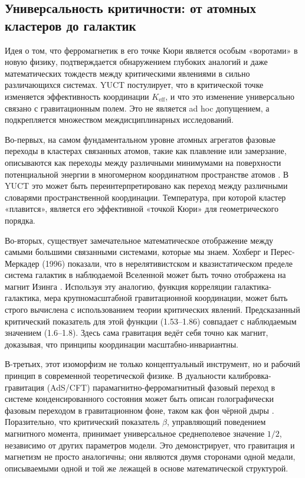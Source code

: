 \documentclass[12pt]{article}
\theoremstyle{remark}
\begin{document}
	\subsection{Универсальность критичности: от атомных кластеров до галактик}
	\label{subsec:universality}
	
	Идея о том, что ферромагнетик в его точке Кюри является особым «воротами» в новую физику, подтверждается обнаружением глубоких аналогий и даже математических тождеств между критическими явлениями в сильно различающихся системах. YUCT постулирует, что в критической точке изменяется эффективность координации $K_{\mathrm{eff}}$, и что это изменение универсально связано с гравитационным полем. Это не является ad hoc допущением, а подкрепляется множеством междисциплинарных исследований.
	
	Во-первых, на самом фундаментальном уровне атомных агрегатов фазовые переходы в кластерах связанных атомов, такие как плавление или замерзание, описываются как переходы между различными минимумами на поверхности потенциальной энергии в многомерном координатном пространстве атомов \cite{Berry2005}. В YUCT это может быть переинтерпретировано как переход между различными словарями пространственной координации. Температура, при которой кластер «плавится», является его эффективной «точкой Кюри» для геометрического порядка.
	
	Во-вторых, существует замечательное математическое отображение между самыми большими связанными системами, которые мы знаем. Хохберг и Перес-Меркадер (1996) показали, что в нерелятивистском и квазистатическом пределе система галактик в наблюдаемой Вселенной может быть точно отображена на магнит Изинга \cite{Hochberg1996}. Используя эту аналогию, функция корреляции галактика-галактика, мера крупномасштабной гравитационной координации, может быть строго вычислена с использованием теории критических явлений. Предсказанный критический показатель для этой функции (1.53–1.86) совпадает с наблюдаемым значением (1.6–1.8). Здесь сама гравитация ведёт себя точно как магнит, доказывая, что принципы координации масштабно-инвариантны.
	
	В-третьих, этот изоморфизм не только концептуальный инструмент, но и рабочий принцип в современной теоретической физике. В дуальности калибровка-гравитация (AdS/CFT) парамагнитно-ферромагнитный фазовый переход в системе конденсированного состояния может быть описан голографически фазовым переходом в гравитационном фоне, таком как фон чёрной дыры \cite{Ghotbabadi2021, Zbl2021}. Поразительно, что критический показатель $\beta$, управляющий поведением магнитного момента, принимает универсальное среднеполевое значение $1/2$, независимо от других параметров модели. Это демонстрирует, что гравитация и магнетизм не просто аналогичны; они являются двумя сторонами одной медали, описываемыми одной и той же лежащей в основе математической структурой.
	
\end{document}
